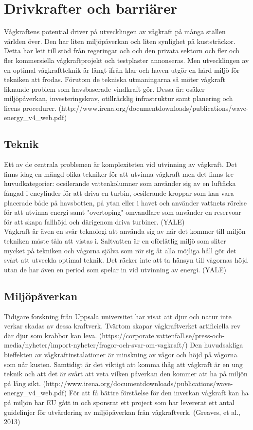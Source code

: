 \documentclass[10pt,a4paper,oneside]{article}
\begin{document}
\section{Drivkrafter och barriärer}
Vågkraftens potential driver på utvecklingen av vågkraft på många ställen världen över. Den har liten miljöpåverkan och liten synlighet på kuststräckor. Detta har lett till stöd från regeringar och och den privata sektorn och fler och fler kommersiella vågkraftprojekt och testplaster annonseras. Men utvecklingen av en optimal vågkraftteknik är långt ifrån klar och haven utgör en hård miljö för tekniken att frodas. Förutom de tekniska utmaningarna så möter vågkraft liknande problem som havsbaserade vindkraft gör. Dessa är: osäker miljöpåverkan, investeringskrav, otillräcklig infrastruktur samt planering och licens procedurer. (http://www.irena.org/documentdownloads/publications/wave-energy_v4_web.pdf)

\subsection{Teknik}
Ett av de centrala problemen är komplexiteten vid utvinning av vågkraft. Det finns idag en mängd olika tekniker för att utvinna vågkraft men det finns tre huvudkategorier:  ocsilerande vattenkolumner som använder sig av en luftficka fångad i encylinder för att driva en turbin, ocsilerande kroppar som kan vara placerade både på havsbotten, på ytan eller i havet och använder vattnets rörelse för att utvinna energi samt "overtoping" omvandlare som använder en reservoar för att skapa fallhöjd och därigenom driva turbiner. (YALE)\\

Vågkraft är även en svår teknologi att använda sig av när det kommer till miljön tekniken måste tåla att vistas i. Saltvatten är en oförlåtlig miljö som sliter mycket på tekniken och vågorna själva som rör sig åt alla möjliga håll gör det svårt att utveckla optimal teknik. Det räcker inte att ta hänsyn till vågornas höjd utan de har även en period som spelar in vid utvinning av energi. (YALE)


\subsection{Miljöpåverkan}
Tidigare forskning från Uppsala universitet har visat att djur och natur inte verkar skadas av dessa kraftverk. Tvärtom skapar vågkraftverket artificiella rev där djur som krabbor kan leva. (https://corporate.vattenfall.se/press-och-media/nyheter/import-nyheter/fragor-och-svar-om-vagkraft/)
Den huvudsakliga bieffekten av vågkraftinstalationer är minskning av vågor och höjd på vågorna som når kusten. Samtidigt är det viktigt att komma ihåg att vågkraft är en ung teknik och att det är svårt att veta vilken påverkan den kommer att ha på miljön på lång sikt. (http://www.irena.org/documentdownloads/publications/wave-energy_v4_web.pdf) För att få bättre förståelse för den inverkan vågkraft kan ha på miljön har EU gått in och sponsrat ett project som har levererat ett antal guidelinjer för utvärdering av miljöpåverkan från vågkraftverk. (Greaves, et al., 2013)
\end{document}
